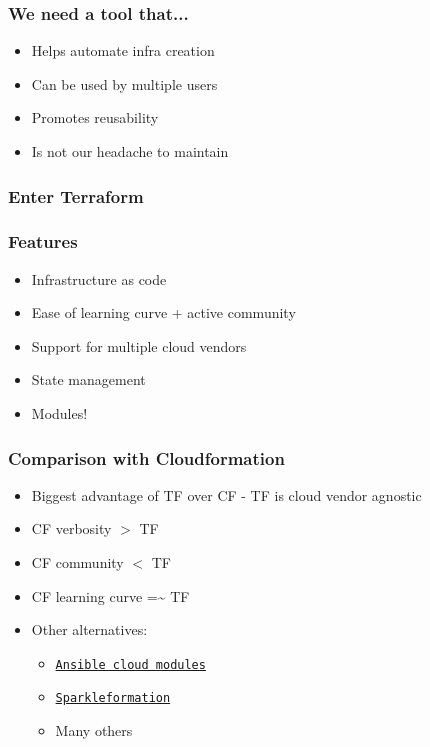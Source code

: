 \documentclass[9pt]{beamer}
\newcommand{\myblue} [1] {{\color{blue}#1}}
\begin{document}
\begin{frame}[fragile]
  \frametitle{We need a tool that...}

  \begin{itemize}[<+->]
    \item Helps automate infra creation
    \item Can be used by multiple users
    \item Promotes reusability
    \item Is not our headache to maintain
  \end{itemize}

\end{frame}

\begin{frame}[fragile]
  \frametitle{Enter Terraform}
\end{frame}

\begin{frame}[fragile]
  \frametitle{Features}

  \begin{itemize}[<+->]
    \item Infrastructure as code
    \item Ease of learning curve + active community
    \item Support for multiple cloud vendors
    \item State management
    \item Modules!
  \end{itemize}

\end{frame}

\begin{frame}[fragile]
  \frametitle{Comparison with Cloudformation}

  \begin{itemize}[<+->]
    \item Biggest advantage of TF over CF - TF is cloud vendor agnostic
    \item CF verbosity $>$ TF
    \item CF community $<$ TF
    \item CF learning curve =\~{} TF
    \item Other alternatives:
      \begin{itemize}[<+->]
        \item \myblue{\href{http://docs.ansible.com/ansible/latest/modules/list_of_cloud_modules.html}{\texttt{Ansible cloud modules}}}
        \item \myblue{\href{https://www.sparkleformation.io/}{\texttt{Sparkleformation}}}
        \item Many others
      \end{itemize}
  \end{itemize}
\end{frame}
\end{document}
